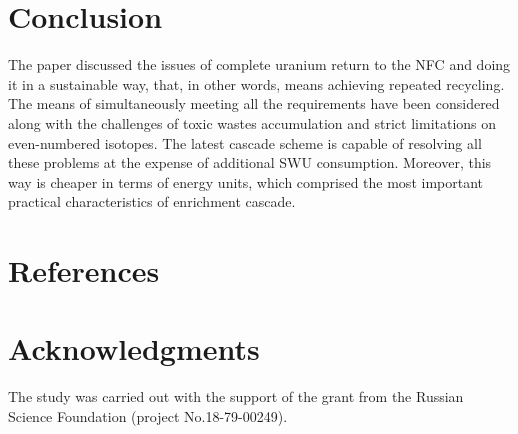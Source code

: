 \documentclass[a4paper]{jpconf}
\begin{document}
\section{Conclusion}
The paper discussed the issues of complete uranium return to the NFC and doing it in a sustainable way, that, in other words, means achieving repeated recycling. The means of simultaneously meeting all the requirements have been considered along with the challenges of toxic wastes accumulation and strict limitations on even-numbered isotopes. The latest cascade scheme is capable of resolving all these problems at the expense of additional SWU consumption. Moreover, this way is cheaper in terms of energy units, which comprised the most important practical characteristics of enrichment cascade.



\section*{References}





\section*{Acknowledgments}
The study was carried out with the support of the grant from the Russian Science Foundation (project No.18-79-00249).
\end{document}
